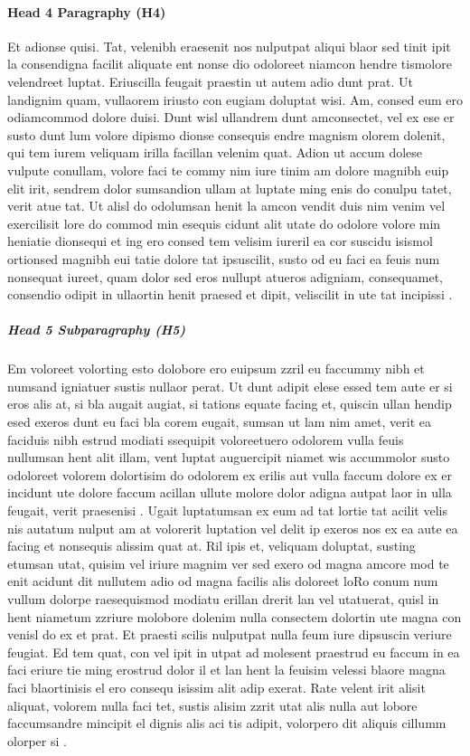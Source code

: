 \paragraph{Head 4 Paragraphy (H4)}
Et adionse quisi. Tat, velenibh eraesenit nos nulputpat aliqui blaor sed tinit ipit la consendigna facilit aliquate ent nonse dio odoloreet niamcon hendre tismolore velendreet luptat. Eriuscilla feugait praestin ut autem adio dunt prat. Ut landignim quam, vullaorem iriusto con eugiam doluptat wisi.
Am, consed eum \cite{jolliffe2002pca} ero odiamcommod dolore duisi.
Dunt wisl ullandrem dunt amconsectet, vel ex ese er susto dunt lum volore dipismo dionse consequis endre magnism olorem dolenit, qui tem iurem veliquam irilla facillan velenim quat.
Adion ut accum dolese vulpute conullam, volore faci te commy nim iure tinim am dolore magnibh euip elit irit, sendrem dolor sumsandion ullam at luptate ming enis do conulpu tatet, verit atue tat. Ut alisl do odolumsan henit la amcon vendit duis nim venim vel exercilisit lore do commod min esequis cidunt alit utate do odolore volore min heniatie dionsequi et ing ero consed tem velisim iureril ea cor suscidu isismol ortionsed magnibh eui tatie dolore tat ipsuscilit, susto od eu faci ea feuis num nonsequat iureet, quam dolor sed eros nullupt atueros adigniam, consequamet, consendio odipit in ullaortin henit praesed et dipit, veliscilit in ute tat incipissi \cite{yao2002can}.



\subparagraph{Head 5 Subparagraphy (H5)}
Em voloreet volorting esto dolobore ero euipsum zzril eu faccummy nibh et numsand igniatuer sustis nullaor perat. Ut dunt adipit elese essed tem aute er si eros alis at, si bla augait augiat, si tations equate facing et, quiscin ullan hendip esed exeros dunt eu faci bla corem eugait, sumsan ut lam nim amet, verit ea faciduis nibh estrud modiati ssequipit voloreetuero odolorem vulla feuis nullumsan hent alit illam, vent luptat auguercipit niamet wis accummolor susto odoloreet volorem dolortisim do odolorem ex erilis aut vulla faccum dolore ex er incidunt ute dolore faccum acillan ullute molore dolor adigna autpat laor in ulla feugait, verit praesenisi \cite{madden2002tta}.
Ugait luptatumsan ex eum ad tat lortie tat acilit velis nis autatum nulput am at volorerit luptation vel delit ip exeros nos ex ea aute ea facing et nonsequis alissim quat at. Ril ipis et, veliquam doluptat, susting etumsan utat, quisim vel iriure magnim ver sed exero od magna amcore mod te enit acidunt dit nullutem adio od magna facilis alis doloreet loRo conum num vullum dolorpe raesequismod modiatu erillan drerit lan vel utatuerat, quisl in hent niametum zzriure molobore dolenim nulla consectem dolortin ute magna con venisl do ex et prat. Et praesti scilis nulputpat nulla feum iure dipsuscin veriure feugiat. Ed tem quat, con vel ipit in utpat ad molesent praestrud eu faccum in ea faci eriure tie ming erostrud dolor il et lan hent la feuisim velessi blaore magna faci blaortinisis el ero consequ isissim alit adip exerat. Rate velent irit alisit aliquat, volorem nulla faci tet, sustis alisim zzrit utat alis nulla aut lobore faccumsandre mincipit el dignis alis aci tis adipit, volorpero dit aliquis cillumm olorper si \cite{jain2004ass, jolliffe2002pca}.

